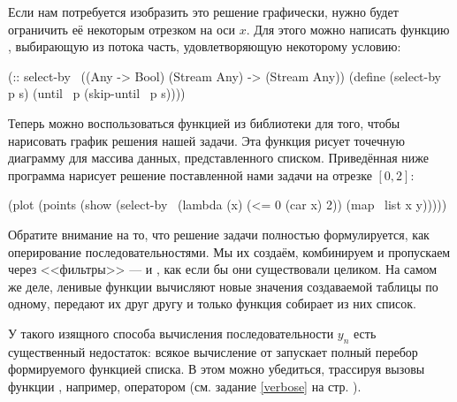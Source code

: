 Если нам потребуется изобразить это решение графически, нужно будет ограничить её некоторым отрезком на оси $x$. Для этого можно написать функцию , выбирающую из потока часть, удовлетворяющую некоторому условию:
\begin{Definition}[emph={p,s}]
(:: select-by~ ((Any -> Bool) (Stream Any) -> (Stream Any))
  (define (select-by~ p s)
    (until~ p (skip-until~ p s))))
\end{Definition}

Теперь можно воспользоваться функцией  из библиотеки  для того, чтобы нарисовать график решения нашей задачи. Эта функция рисует точечную диаграмму для массива данных, представленного списком. Приведённая ниже программа нарисует решение поставленной нами задачи на отрезке $[0,2]$:
\begin{SchemeCode}
(plot 
  (points (show 
           (select-by~ (lambda (x) (<= 0 (car x) 2))
                       (map~ list x y)))))
\end{SchemeCode}

Обратите внимание на то, что решение задачи полностью формулируется, как оперирование последовательностями. Мы их создаём, комбинируем и пропускаем через <<фильтры>> ---  и , как если бы они существовали целиком. На самом же деле, ленивые функции вычисляют новые значения создаваемой таблицы по одному, передают их друг другу и только функция  собирает из них список.

У такого изящного способа вычисления последовательности $y_n$ есть существенный недостаток: всякое вычисление  от  запускает полный перебор формируемого функцией  списка. В этом можно убедиться, трассируя вызовы функции , например, оператором  (см. задание \ref{verbose} на стр. \pageref{verbose}).
\vspace{-\smallskipamount}
\vspace{-\smallskipamount}
\vspace{-\smallskipamount}
\vspace{-\smallskipamount}
\vspace{-\smallskipamount}
\vspace{-\smallskipamount}
\vspace{-\smallskipamount}


